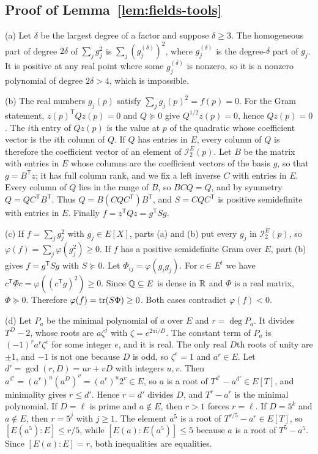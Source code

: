 \subsection{Proof of Lemma~\ref{lem:fields-tools}}
\label{app:fields-tools}

(a) Let $\delta$ be the largest degree of a factor and suppose $\delta\ge3$.
The homogeneous part of degree $2\delta$ of $\sum_jg_j^2$ is
$\sum_j(g_j^{(\delta)})^2$, where $g_j^{(\delta)}$ is the degree-$\delta$
part of $g_j$. It is positive at any real point where some
$g_j^{(\delta)}$ is nonzero, so it is a nonzero polynomial of degree
$2\delta>4$, which is impossible.

(b) The real numbers $g_j(p)$ satisfy $\sum_jg_j(p)^2=f(p)=0$. For the Gram
statement, $z(p)^{\mathsf T}Qz(p)=0$ and $Q\succeq0$ give
$Q^{1/2}z(p)=0$, hence $Qz(p)=0$. The $i$th entry of $Qz(p)$ is the value
at $p$ of the quadratic whose coefficient vector is the $i$th column of $Q$.
If $Q$ has entries in $E$, every column of $Q$ is therefore the coefficient
vector of an element of $\mathcal I_2^E(p)$. Let $B$ be the matrix with
entries in $E$ whose columns are the coefficient vectors of the basis $g$,
so that $g=B^{\mathsf T}z$; it has full column rank, and we fix a left
inverse $C$ with entries in $E$. Every column of $Q$ lies in the range of
$B$, so $BCQ=Q$, and by symmetry $Q=QC^{\mathsf T}B^{\mathsf T}$. Thus
$Q=B(CQC^{\mathsf T})B^{\mathsf T}$, and $S=CQC^{\mathsf T}$ is positive
semidefinite with entries in $E$. Finally
$f=z^{\mathsf T}Qz=g^{\mathsf T}Sg$.

(c) If $f=\sum_jg_j^2$ with $g_j\in E[X]$, parts (a) and (b) put every
$g_j$ in $\mathcal I_2^E(p)$, so $\varphi(f)=\sum_j\varphi(g_j^2)\ge0$. If
$f$ has a positive semidefinite Gram over $E$, part (b) gives
$f=g^{\mathsf T}Sg$ with $S\succeq0$. Let $\Phi_{ij}=\varphi(g_ig_j)$.
For $c\in E^t$ we have $c^{\mathsf T}\Phi c=\varphi((c^{\mathsf T}g)^2)\ge0$.
Since $\mathbb Q\subseteq E$ is dense in $\mathbb R$ and $\Phi$ is a real matrix,
$\Phi\succeq0$. Therefore $\varphi(f)=\operatorname{tr}(S\Phi)\ge0$. Both cases contradict
$\varphi(f)<0$.

(d) Let $P_a$ be the minimal polynomial of $a$ over $E$ and $r=\deg P_a$.
It divides $T^D-2$, whose roots are $a\zeta^j$ with $\zeta=e^{2\pi\mathrm
i/D}$. The constant term of $P_a$ is $(-1)^ra^r\zeta^e$ for some integer
$e$, and it is real. The only real $D$th roots of unity are $\pm1$, and
$-1$ is not one because $D$ is odd, so $\zeta^e=1$ and $a^r\in E$. Let
$d'=\gcd(r,D)=ur+vD$ with integers $u,v$. Then
$a^{d'}=(a^r)^u(a^D)^v=(a^r)^u2^v\in E$, so $a$ is a root of
$T^{d'}-a^{d'}\in E[T]$, and minimality gives $r\le d'$. Hence $r=d'$
divides $D$, and $T^r-a^r$ is the minimal polynomial. If $D=\ell$ is prime and
$a\notin E$, then $r>1$ forces $r=\ell$. If $D=5^k$ and $a\notin E$, then
$r=5^j$ with $j\ge1$. The element $a^5$ is a root of
$T^{r/5}-a^r\in E[T]$, so $[E(a^5):E]\le r/5$, while
$[E(a):E(a^5)]\le5$ because $a$ is a root of $T^5-a^5$. Since
$[E(a):E]=r$, both inequalities are equalities.

